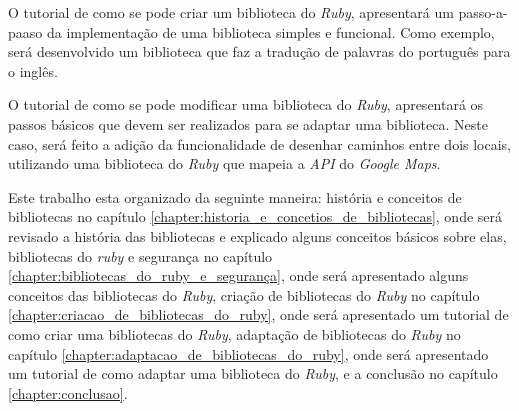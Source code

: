 O tutorial de como se pode criar um biblioteca do \emph{Ruby}, apresentará
um passo-a-paaso da implementação de uma biblioteca simples e funcional. Como exemplo,
será desenvolvido um biblioteca que faz a tradução de palavras do português para o inglês.

O tutorial de como se pode modificar uma biblioteca do \emph{Ruby}, apresentará
os passos básicos que devem ser realizados para se adaptar uma biblioteca. Neste caso, será
feito a adição da funcionalidade de desenhar caminhos entre dois locais, utilizando uma
biblioteca do \emph{Ruby} que mapeia a \emph{API} do \emph{Google Maps}. 

Este trabalho esta organizado da seguinte maneira: história e conceitos de
bibliotecas no capítulo \ref{chapter:historia_e_concetios_de_bibliotecas}, onde será
revisado a história das bibliotecas e explicado alguns conceitos básicos sobre elas,
bibliotecas do \emph{ruby} e segurança no capítulo \ref{chapter:bibliotecas_do_ruby_e_segurança},
onde será apresentado alguns conceitos das bibliotecas do \emph{Ruby}, criação de
bibliotecas do \emph{Ruby} no capítulo 
\ref{chapter:criacao_de_bibliotecas_do_ruby}, onde será apresentado
um tutorial de como criar uma bibliotecas do \emph{Ruby}, adaptação de
bibliotecas do \emph{Ruby} no capítulo 
\ref{chapter:adaptacao_de_bibliotecas_do_ruby}, onde será apresentado
um tutorial de como adaptar uma biblioteca do \emph{Ruby}, e a
conclusão no capítulo \ref{chapter:conclusao}.